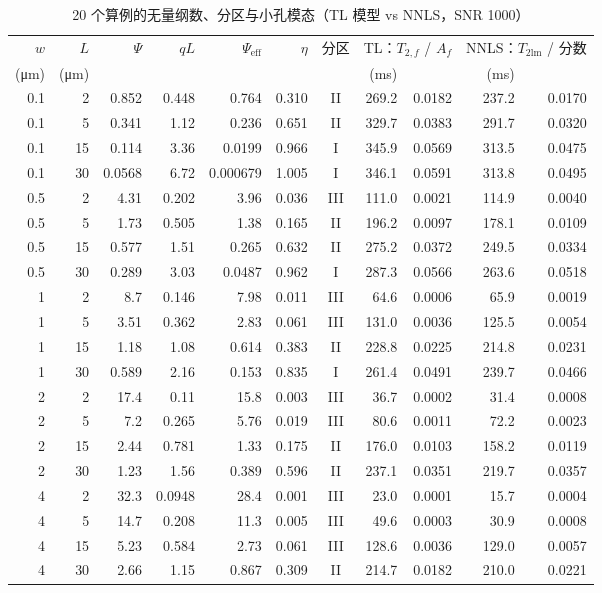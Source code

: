 \begin{table}[htbp]\centering\small
\caption{20 个算例的无量纲数、分区与小孔模态（TL 模型 vs NNLS，SNR 1000）}\label{tab:regimes}
\begin{tabular}{rrrrrrcrrrr}\toprule
$w$ & $L$ & $\Psi$ & $qL$ & $\Psi_{\mathrm{eff}}$ & $\eta$ & 分区 & \multicolumn{2}{c}{TL：$T_{2,f}$ / $A_f$} & \multicolumn{2}{c}{NNLS：$T_{2\mathrm{lm}}$ / 分数} \\
(\si{\micro m}) & (\si{\micro m}) & & & & & & (ms) & & (ms) & \\ \midrule
0.1 & 2 & 0.852 & 0.448 & 0.764 & 0.310 & II & 269.2 & 0.0182 & 237.2 & 0.0170 \\
0.1 & 5 & 0.341 & 1.12 & 0.236 & 0.651 & II & 329.7 & 0.0383 & 291.7 & 0.0320 \\
0.1 & 15 & 0.114 & 3.36 & 0.0199 & 0.966 & I & 345.9 & 0.0569 & 313.5 & 0.0475 \\
0.1 & 30 & 0.0568 & 6.72 & 0.000679 & 1.005 & I & 346.1 & 0.0591 & 313.8 & 0.0495 \\
0.5 & 2 & 4.31 & 0.202 & 3.96 & 0.036 & III & 111.0 & 0.0021 & 114.9 & 0.0040 \\
0.5 & 5 & 1.73 & 0.505 & 1.38 & 0.165 & II & 196.2 & 0.0097 & 178.1 & 0.0109 \\
0.5 & 15 & 0.577 & 1.51 & 0.265 & 0.632 & II & 275.2 & 0.0372 & 249.5 & 0.0334 \\
0.5 & 30 & 0.289 & 3.03 & 0.0487 & 0.962 & I & 287.3 & 0.0566 & 263.6 & 0.0518 \\
1 & 2 & 8.7 & 0.146 & 7.98 & 0.011 & III & 64.6 & 0.0006 & 65.9 & 0.0019 \\
1 & 5 & 3.51 & 0.362 & 2.83 & 0.061 & III & 131.0 & 0.0036 & 125.5 & 0.0054 \\
1 & 15 & 1.18 & 1.08 & 0.614 & 0.383 & II & 228.8 & 0.0225 & 214.8 & 0.0231 \\
1 & 30 & 0.589 & 2.16 & 0.153 & 0.835 & I & 261.4 & 0.0491 & 239.7 & 0.0466 \\
2 & 2 & 17.4 & 0.11 & 15.8 & 0.003 & III & 36.7 & 0.0002 & 31.4 & 0.0008 \\
2 & 5 & 7.2 & 0.265 & 5.76 & 0.019 & III & 80.6 & 0.0011 & 72.2 & 0.0023 \\
2 & 15 & 2.44 & 0.781 & 1.33 & 0.175 & II & 176.0 & 0.0103 & 158.2 & 0.0119 \\
2 & 30 & 1.23 & 1.56 & 0.389 & 0.596 & II & 237.1 & 0.0351 & 219.7 & 0.0357 \\
4 & 2 & 32.3 & 0.0948 & 28.4 & 0.001 & III & 23.0 & 0.0001 & 15.7 & 0.0004 \\
4 & 5 & 14.7 & 0.208 & 11.3 & 0.005 & III & 49.6 & 0.0003 & 30.9 & 0.0008 \\
4 & 15 & 5.23 & 0.584 & 2.73 & 0.061 & III & 128.6 & 0.0036 & 129.0 & 0.0057 \\
4 & 30 & 2.66 & 1.15 & 0.867 & 0.309 & II & 214.7 & 0.0182 & 210.0 & 0.0221 \\
\bottomrule\end{tabular}\end{table}
